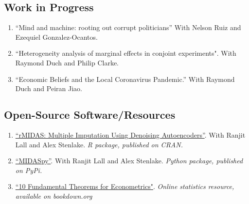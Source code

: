 \documentclass[11pt, a4paper]{article}
\begin{document}
\subsection*{Work in Progress}

\begin{enumerate}

\item ``Mind and machine: rooting out corrupt politicians'' With Nelson Ruiz and Ezequiel Gonzalez-Ocantos.

\item ``Heterogeneity analysis of marginal effects in conjoint experiments".  With Raymond Duch and Philip Clarke.

\item ``Economic Beliefs and the Local Coronavirus Pandemic.'' With Raymond Duch and Peiran Jiao.


\end{enumerate}


\subsection*{Open-Source Software/Resources}

\begin{enumerate}

  \item \href{https://CRAN.R-project.org/package=rMIDAS}{``rMIDAS: Multiple Imputation Using Denoising Autoencoders''}. With Ranjit Lall and Alex Stenlake. \textit{R package, published on CRAN.}

  \item \href{https://pypi.org/project/MIDASpy/}{``MIDASpy''}. With Ranjit Lall and Alex Stenlake. \textit{Python package, published on PyPi.}

  \item \href{https://bookdown.org/ts_robinson1994/10_fundamental_theorems_for_econometrics/vtDma6bZJ/}{``10 Fundamental Theorems for Econometrics"}. \textit{Online statistics resource, available on bookdown.org}

\end{enumerate}
\end{document}
